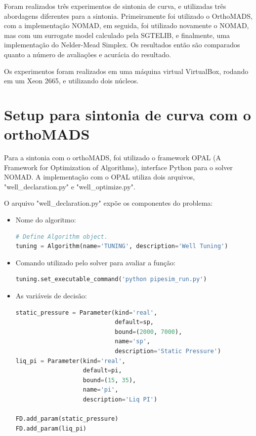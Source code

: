Foram realizados três experimentos de sintonia de curva, e utilizadas três abordagens diferentes para a sintonia. Primeiramente foi utilizado o OrthoMADS, com a implementação NOMAD, em seguida, foi utilizado novamente o NOMAD, mas com um surrogate model calculado pela SGTELIB, e finalmente, uma implementação do Nelder-Mead Simplex. Os resultados então são comparados quanto a número de avaliações e acurácia do resultado.

Os experimentos foram realizados em uma máquina virtual VirtualBox, rodando em um Xeon 2665, e utilizando dois núcleos.

\section{Setup para sintonia de curva com o orthoMADS}
Para a sintonia com o orthoMADS, foi utilizado o framework OPAL (A Framework for Optimization of Algorithms), interface Python para o solver NOMAD.
A implementação com o OPAL utiliza dois arquivos, "well\_declaration.py" e "well\_optimize.py".

O arquivo "well\_declaration.py" expõe os componentes do problema:

\begin{itemize}
\item Nome do algoritmo:
\begin{lstlisting}[language=Python]
# Define Algorithm object.
tuning = Algorithm(name='TUNING', description='Well Tuning')
\end{lstlisting}
\end{itemize}

\begin{itemize}
\item Comando utilizado pelo solver para avaliar a função:
\begin{lstlisting}[language=Python]
tuning.set_executable_command('python pipesim_run.py')
\end{lstlisting}
\end{itemize}


\begin{itemize}
\item As variáveis de decisão:
\begin{lstlisting}[language=Python]
static_pressure = Parameter(kind='real', 
                            default=sp, 
                            bound=(2000, 7000),
                            name='sp', 
                            description='Static Pressure')
liq_pi = Parameter(kind='real', 
                   default=pi, 
                   bound=(15, 35),
                   name='pi', 
                   description='Liq PI')

FD.add_param(static_pressure)
FD.add_param(liq_pi)
\end{lstlisting}
\end{itemize}


